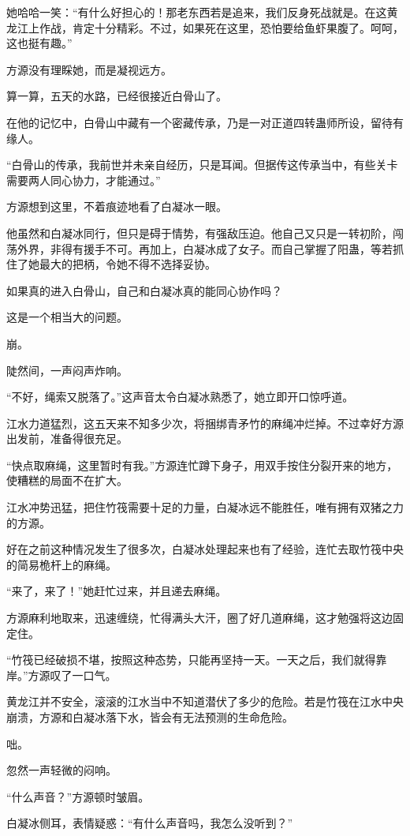 \begin{this_body}
她哈哈一笑：“有什么好担心的！那老东西若是追来，我们反身死战就是。在这黄龙江上作战，肯定十分精彩。不过，如果死在这里，恐怕要给鱼虾果腹了。呵呵，这也挺有趣。”

方源没有理睬她，而是凝视远方。

算一算，五天的水路，已经很接近白骨山了。

在他的记忆中，白骨山中藏有一个密藏传承，乃是一对正道四转蛊师所设，留待有缘人。

“白骨山的传承，我前世并未亲自经历，只是耳闻。但据传这传承当中，有些关卡需要两人同心协力，才能通过。”

方源想到这里，不着痕迹地看了白凝冰一眼。

他虽然和白凝冰同行，但只是碍于情势，有强敌压迫。他自己又只是一转初阶，闯荡外界，非得有援手不可。再加上，白凝冰成了女子。而自己掌握了阳蛊，等若抓住了她最大的把柄，令她不得不选择妥协。

如果真的进入白骨山，自己和白凝冰真的能同心协作吗？

这是一个相当大的问题。

崩。

陡然间，一声闷声炸响。

“不好，绳索又脱落了。”这声音太令白凝冰熟悉了，她立即开口惊呼道。

江水力道猛烈，这五天来不知多少次，将捆绑青矛竹的麻绳冲烂掉。不过幸好方源出发前，准备得很充足。

“快点取麻绳，这里暂时有我。”方源连忙蹲下身子，用双手按住分裂开来的地方，使糟糕的局面不在扩大。

江水冲势迅猛，把住竹筏需要十足的力量，白凝冰远不能胜任，唯有拥有双猪之力的方源。

好在之前这种情况发生了很多次，白凝冰处理起来也有了经验，连忙去取竹筏中央的简易桅杆上的麻绳。

“来了，来了！”她赶忙过来，并且递去麻绳。

方源麻利地取来，迅速缠绕，忙得满头大汗，圈了好几道麻绳，这才勉强将这边固定住。

“竹筏已经破损不堪，按照这种态势，只能再坚持一天。一天之后，我们就得靠岸。”方源叹了一口气。

黄龙江并不安全，滚滚的江水当中不知道潜伏了多少的危险。若是竹筏在江水中央崩溃，方源和白凝冰落下水，皆会有无法预测的生命危险。

咄。

忽然一声轻微的闷响。

“什么声音？”方源顿时皱眉。

白凝冰侧耳，表情疑惑：“有什么声音吗，我怎么没听到？”


\end{this_body}

